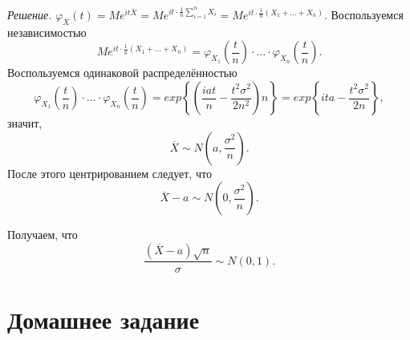 \textit{Решение.}
$ \varphi_{ \overline{X}} \left( t \right) =
  Me^{it \overline{X}} =
  Me^{it \cdot \frac{1}{n} \sum \limits_{i = 1}^n X_i} =
  Me^{it \cdot \frac{1}{n} \left( X_1 + \dotsc + X_n \right) }$.
Воспользуемся независимостью
$$Me^{it \cdot \frac{1}{n} \left( X_1 + \dotsc + X_n \right) } =
  \varphi_{X_1} \left( \frac{t}{n} \right) \cdot \dotsc \cdot
  \varphi_{X_n} \left( \frac{t}{n} \right).$$
Воспользуемся одинаковой распределённостью
$$ \varphi_{X_1} \left( \frac{t}{n} \right) \cdot \dotsc \cdot
  \varphi_{X_n} \left( \frac{t}{n} \right) =
  exp \left\{ \left( \frac{iat}{n} - \frac{t^2 \sigma^2}{2n^2} \right) n \right\} =
  exp \left\{ ita - \frac{t^2 \sigma^2}{2n} \right\},$$
значит,
$$ \overline{X} \sim
  N \left( a, \frac{ \sigma^2}{n} \right).$$
После этого центрированием следует, что
$$ \overline{X} - a \sim
  N \left( 0, \frac{ \sigma^2}{n} \right).$$

Получаем, что
$$ \frac{ \left( \overline{X} - a \right) \sqrt{n}}{ \sigma } \sim
  N \left( 0, 1 \right).$$

\section*{Домашнее задание}
